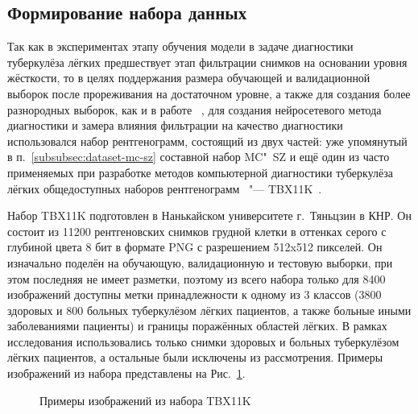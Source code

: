 \subsection{Формирование набора данных} \label{subsubsec:dataset-tbx}

Так как в экспериментах этапу обучения модели в задаче диагностики туберкулёза лёгких предшествует этап фильтрации снимков на основании уровня жёсткости, то в целях поддержания размера обучающей и валидационной выборок после прореживания на достаточном уровне, а также для создания более разнородных выборок, как и в работе ~\cite{dovganich2022automatic}, для создания нейросетевого метода диагностики и замера влияния фильтрации на качество диагностики использовался набор рентгенограмм, состоящий из двух частей: уже упомянутый в п.~\ref{subsubsec:dataset-mc-sz} составной набор MC"~SZ и ещё один из часто применяемых при разработке методов компьютерной диагностики туберкулёза лёгких общедоступных наборов рентгенограмм~\cite{singh2022evolution, santosh2022advances} "--- TBX11K~\cite{liu2020rethinking}.


Набор TBX11K подготовлен в Нанькайском университете г.~Тяньцзин в КНР. Он состоит из 11200 рентгеновских снимков грудной клетки в оттенках серого с глубиной цвета 8 бит в формате PNG с разрешением 512x512 пикселей. Он изначально поделён на обучающую, валидационную и тестовую выборки, при этом последняя не имеет разметки, поэтому из всего набора только для 8400 изображений доступны метки принадлежности к одному из 3 классов (3800 здоровых и 800 больных туберкулёзом лёгких пациентов, а также больные иными заболеваниями пациенты) и границы поражённых областей лёгких. В рамках исследования использовались только снимки здоровых и больных туберкулёзом лёгких пациентов, а остальные были исключены из рассмотрения. Примеры изображений из набора представлены на Рис.~\ref{fig:samples-tbx}.

\begin{figure}[ht]
	\caption{Примеры изображений из набора TBX11K}
	\label{fig:samples-tbx}
\end{figure}

